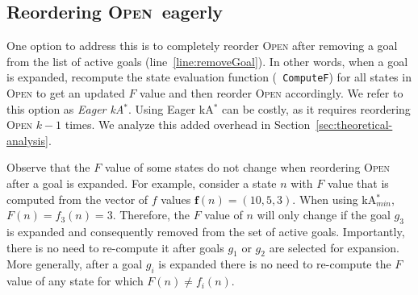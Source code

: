 \documentclass{aicom2e}
\newcommand{\kgs}{$k$GP}
\newcommand{\kastar}{kA$^*$}
\newcommand{\kastarmin}{kA$^*_{min}$}
\newcommand{\kastarmax}{kA$^*_{max}$}
\newcommand{\open}{\textsc{Open}}
\begin{document}






\subsection{Reordering \open\ eagerly}
\label{sec:eager}
One option to address this is to completely reorder \open{} after removing a
goal from the list of active goals (line~\ref{line:removeGoal}). In other
words, when a goal is expanded, recompute the state evaluation function ({\tt
ComputeF}) for all states in \open{} to get an updated $F$ value and then
reorder \open{} accordingly. We refer to this option as {\em Eager \kastar{}}. 
Using Eager \kastar{} can be costly, as it requires reordering \open{} $k-1$ 
times. We analyze this added overhead in Section~\ref{sec:theoretical-analysis}. 


Observe that the $F$ value of some states do not change when reordering \open{}
after a goal is expanded. For example, consider a state $n$ with $F$ value that
is computed from the vector of $f$ values $\textbf{f}(n)=(10,5,3)$. When using
\kastarmin{}, $F(n)=f_3(n)=3$. Therefore, the $F$ value of $n$ will only change
if the goal $g_3$ is expanded and consequently removed from the set of active
goals. Importantly, there is no need to re-compute it after goals $g_1$ or
$g_2$ are selected for expansion. More generally, after a goal $g_i$ is
expanded there is no need to re-compute the $F$ value of any state for which
$F(n)\neq f_i(n)$.
\end{document}
